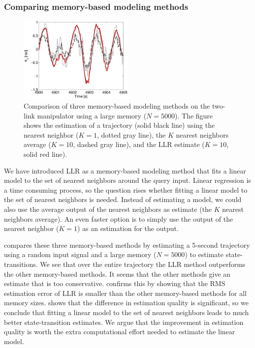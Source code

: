 \subsubsection{Comparing memory-based modeling methods}\label{sec:LLR-2link_ModelBasedComparison}

\begin{figure}[htbp]
	\centering
		\includegraphics[width=0.5\textwidth]{Figures/LLR-robotarm_trajectory}
		\caption[Comparing three memory-based modeling methods]{Comparison of three memory-based modeling methods on the two-link manipulator using a large memory ($N=5000$). The figure shows the estimation of a trajectory (solid black line) using the nearest neighbor ($K=1$, dotted gray line), the $K$ nearest neighbors average ($K=10$, dashed gray line), and the \ac{LLR} estimate ($K=10$, solid red line).}
	\label{fig:LLR-robotarm_trajectory}
\end{figure}
We have introduced \ac{LLR} as a memory-based modeling method that fits a linear model to the set of nearest neighbors around the query input. Linear regression is a time consuming process, so the question rises whether fitting a linear model to the set of nearest neighbors is needed. Instead of estimating a model, we could also use the average output of the nearest neighbors as estimate (the $K$ nearest neighbors average). An even faster option is to simply use the output of the nearest neighbor ($K=1$) as an estimation for the output.
 
 compares these three memory-based methods by estimating a 5-second trajectory using a random input signal and a large memory ($N=5000$) to estimate state-transitions. We see that over the entire trajectory the \ac{LLR} method outperforms the other memory-based methods. It seems that the other methods give an estimate that is too conservative.  confirms this by showing that the \ac{RMS} estimation error of \ac{LLR} is smaller than the other memory-based methods for all memory sizes.  shows that the difference in estimation quality is significant, so we conclude that fitting a linear model to the set of nearest neighbors leads to much better state-transition estimates. We argue that the improvement in estimation quality is worth the extra computational effort needed to estimate the linear model.








